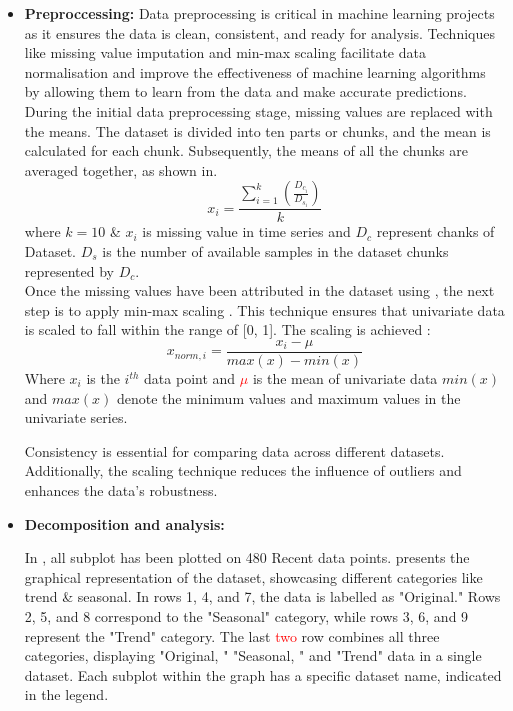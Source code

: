 \documentclass[a4paper, fleqn]{cas-sc}
\theoremstyle{definition}
\theoremstyle{remark}
\begin{document}
\begin{itemize}

\item
\textbf{Preproccessing:  }
Data preprocessing is critical in machine learning projects as it ensures the data is clean,  consistent,  and ready for analysis. Techniques like missing value imputation and min-max scaling facilitate data normalisation and improve the effectiveness of machine learning algorithms by allowing them to learn from the data and make accurate predictions.
During the initial data preprocessing stage,  missing values are replaced with the means. The dataset is divided into ten parts or chunks,  and the mean is calculated for each chunk. Subsequently,  the means of all the chunks are averaged together,  as shown in.
\begin{equation} \label{equ: mean}
        x_i=\frac{\sum_{i=1}^{k} \left(\frac{D_{c_{i}}}{D_{s_{i}}} \right)}{k}
\end{equation}
 where $k=10$ \& $x_i$ is missing value in time series and $D_c$ represent chanks of Dataset. $D_s$ is the number of available samples in the dataset chunks represented by $D_c$. \\
Once the missing values have been attributed in the dataset using , the next step is to apply min-max scaling . This technique ensures that univariate data is scaled to fall within the range of [0, 1]. The scaling is achieved : 
\begin{equation}
        x_{norm,  i}=\frac{x_i - \mu}{max(x)-min(x)}
        \label{equ: minmax}
    \end{equation}
Where $x_i$ is the $i^{th}$ data point and \textcolor{red}{$\mu$} is the mean of univariate data $min(x)$  and $max(x)$ denote the minimum values and maximum values in the univariate series.

Consistency is essential for comparing data across different datasets. Additionally,  the scaling technique reduces the influence of outliers and enhances the data's robustness.


\item
\textbf{Decomposition and analysis: }

In , all subplot has been plotted on 480 Recent data points.  presents the graphical representation of the dataset,  showcasing different categories like trend \&  seasonal. In rows 1,  4,  and 7,  the data is labelled as "Original." Rows 2,  5,  and 8 correspond to the "Seasonal" category,  while rows 3,  6,  and 9 represent the "Trend" category. The last \textcolor{red}{two} row combines all three categories,  displaying "Original, " "Seasonal, " and "Trend" data in a single dataset. Each subplot within the graph has a specific dataset name,  indicated in the legend.


\end{itemize}
\end{document}
